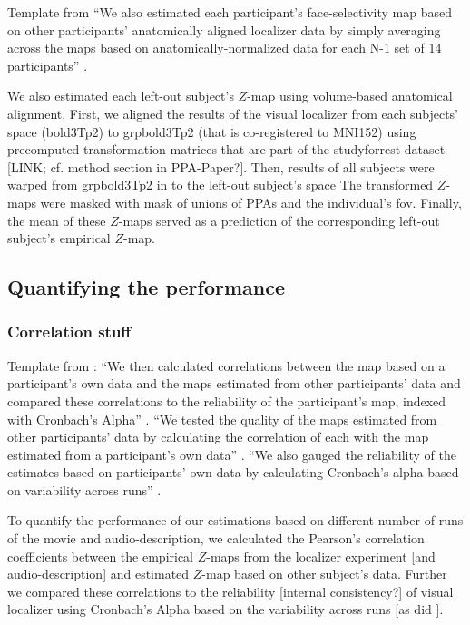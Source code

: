 
Template from \citet{jiahui2020predicting} ``We also estimated each
participant's face-selectivity map based on other participants' anatomically
aligned localizer data by simply averaging across the maps based on
anatomically-normalized data for each N-1 set of 14 participants''
\citep{jiahui2020predicting}.

%
We also estimated each left-out subject's $Z$-map using volume-based anatomical
alignment.
First, we aligned the results of the visual localizer from each subjects' space
(bold3Tp2) to grpbold3Tp2 (that is co-registered to MNI152) using precomputed
transformation matrices that are part of the studyforrest dataset [LINK; cf.
method section in PPA-Paper?].
Then, results of all subjects were warped from grpbold3Tp2 in to the left-out
subject's space
%
The transformed $Z$-maps were masked with mask of unions of PPAs and the
individual's \ac{fov}.
%
Finally, the mean of these $Z$-maps served as a prediction of the corresponding
left-out subject's empirical $Z$-map.


\subsection{Quantifying the performance}


\subsubsection{Correlation stuff}

Template from \citet{jiahui2020predicting}: ``We then calculated correlations
between the map based on a participant's own data and the maps estimated from
other participants' data and compared these correlations to the reliability of
the participant's map, indexed with Cronbach's Alpha''
\citep{jiahui2020predicting}.
%
``We tested the quality of the maps estimated from other participants' data by
calculating the correlation of each with the map estimated from a participant's
own data'' \citep{jiahui2020predicting}.
%
``We also gauged the reliability of the estimates based on participants' own
data by calculating Cronbach's alpha based on variability across runs''
\citep{jiahui2020predicting}.

%
To quantify the performance of our estimations based on different number of runs
of the movie and audio-description, we calculated the Pearson's correlation
coefficients between the empirical $Z$-maps from the localizer experiment [and
audio-description] and estimated $Z$-map based on other subject's data.
%
Further we compared these correlations to the reliability [internal
consistency?] of visual localizer using Cronbach's Alpha based on the
variability across runs [as did
\citep{jiahui2020predicting}].


